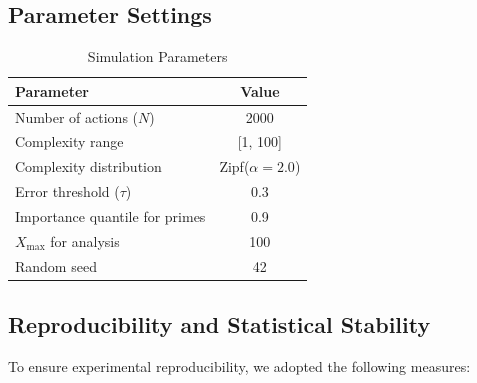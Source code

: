 \documentclass[12pt,a4paper]{article}
\theoremstyle{definition}
\theoremstyle{remark}
\begin{document}
\subsection{Parameter Settings}

\begin{table}[htbp]
\centering
\caption{Simulation Parameters}
\label{tab:parameters}
\begin{tabular}{lc}
\toprule
\textbf{Parameter} & \textbf{Value} \\
\midrule
Number of actions ($N$) & 2000 \\
Complexity range & [1, 100] \\
Complexity distribution & Zipf($\alpha=2.0$) \\
Error threshold ($\tau$) & 0.3 \\
Importance quantile for primes & 0.9 \\
$X_{\max}$ for analysis & 100 \\
Random seed & 42 \\
\bottomrule
\end{tabular}
\end{table}

\subsection{Reproducibility and Statistical Stability}

To ensure experimental reproducibility, we adopted the following measures:
\end{document}
